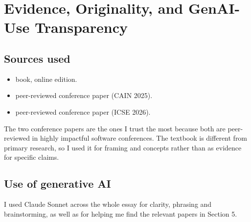 \documentclass[11pt,a4paper]{article}
\begin{document}
\section{Evidence, Originality, and GenAI-Use Transparency}

\subsection*{Sources used}

\begin{itemize}
  \item \citet{ml_production} book, online edition.
  \item \citet{themes_llms} peer-reviewed conference paper (CAIN 2025).
  \item \citet{unified_agent} peer-reviewed conference paper (ICSE 2026).
\end{itemize}

The two conference papers are the ones I trust the most because both are peer-reviewed in highly impactful software conferences. The textbook is different from primary research, so I used it for framing and concepts rather than as evidence for specific claims.

\subsection*{Use of generative AI}

I used Claude Sonnet across the whole essay for clarity, phrasing and brainstorming, as well as for helping me find the relevant papers in Section 5.  


\end{document}
